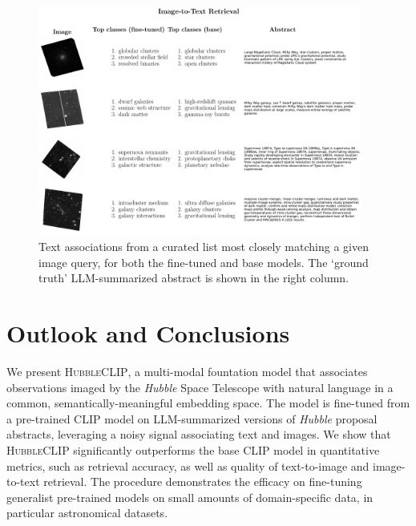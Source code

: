 \documentclass[10pt]{article} %
\newcommand{\hubble}{\emph{Hubble}\xspace}
\begin{document}
\begin{figure}[!h]
\includegraphics[width=0.95\textwidth]{plots/itt.pdf}
\caption{Text associations from a curated list most closely matching a given image query, for both the fine-tuned and base models. The `ground truth' LLM-summarized abstract is shown in the right column.}
\label{fig:itt}
\end{figure}

\section{Outlook and Conclusions}
\label{sec:conclusion}

We present \textsc{HubbleCLIP}, a multi-modal fountation model that associates observations imaged by the \hubble Space Telescope with natural language in a common, semantically-meaningful embedding space. The model is fine-tuned from a pre-trained CLIP model on LLM-summarized versions of \hubble proposal abstracts, leveraging a noisy signal associating text and images. We show that \textsc{HubbleCLIP} significantly outperforms the base CLIP model in quantitative metrics, such as retrieval accuracy, as well as quality of text-to-image and image-to-text retrieval. The procedure demonstrates the efficacy on fine-tuning generalist pre-trained models on small amounts of domain-specific data, in particular astronomical datasets.

\end{document}
